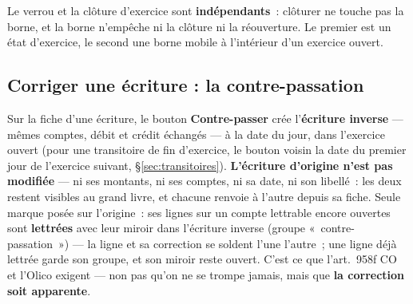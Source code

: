 \documentclass[a4paper,11pt,oneside]{article}
\begin{document}
Le verrou et la clôture d'exercice sont \textbf{indépendants}~: clôturer ne touche pas la borne,
et la borne n'empêche ni la clôture ni la réouverture. Le premier est un état d'exercice, le
second une borne mobile à l'intérieur d'un exercice ouvert.

\subsection{Corriger une écriture : la contre-passation}\label{sec:contre-passation}

Sur la fiche d'une écriture, le bouton \textbf{Contre-passer} crée l'\textbf{écriture
inverse} --- mêmes comptes, débit et crédit échangés --- à la date du jour, dans l'exercice
ouvert (pour une transitoire de fin d'exercice, le bouton voisin la date du premier jour de
l'exercice suivant, \S\ref{sec:transitoires}). \textbf{L'écriture d'origine n'est pas modifiée} --- ni ses montants, ni ses comptes,
ni sa date, ni son libellé~: les deux restent visibles au grand livre, et chacune renvoie à
l'autre depuis sa fiche. Seule marque posée sur l'origine~: ses lignes sur un compte
lettrable encore ouvertes sont \textbf{lettrées} avec leur miroir dans l'écriture inverse
(groupe «~contre-passation~») --- la ligne et sa correction se soldent l'une l'autre~; une
ligne déjà lettrée garde son groupe, et son miroir reste ouvert. C'est ce que l'art.~958f CO et l'Olico
exigent --- non pas qu'on ne se trompe jamais, mais que \textbf{la correction soit
apparente}.
\end{document}
